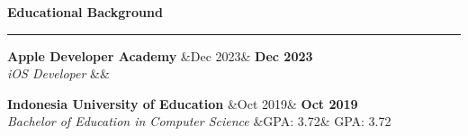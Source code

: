 \documentclass{article}
\newcommand{\header}[1]{
	\vspace{4mm}
	{\large \noindent \textbf{#1}}
	\vspace{1mm}
	\hrule
	\vspace{2mm}
}
\newcommand{\shortitem}[4]{
	\begin{adjustwidth}{}{}
		\textbf{#1} \hfill \ifx&#2& \else \textbf{#2} \fi \\
		\textit{#3} \ifx&#4& \else \hfill #4 \fi
	\end{adjustwidth}
	\vspace{1mm}
}
\begin{document}
\begin{multicols}{2}
		\header{Educational Background}
			\shortitem{Apple Developer Academy}{Dec 2023}{iOS Developer}{}
			\shortitem{Indonesia University of Education}{Oct 2019}{Bachelor of Education in Computer Science}{GPA: 3.72}

	\end{multicols}
\end{document}
